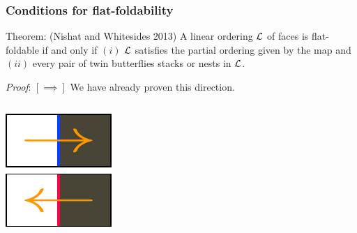 \documentclass{beamer}
\begin{document}
\begin{frame}
\frametitle{Conditions for flat-foldability}

\begin{block}{Theorem: (Nishat and Whitesides 2013)}
A linear ordering $\mathcal{L}$ of faces is flat-foldable if and only if $(i)$ $\mathcal{L}$ satisfies the partial ordering given by the map and $(ii)$ every pair of twin butterflies stacks or nests in $\mathcal{L}$. 
\end{block}

\medskip

\pause

\textit{Proof}: $[\implies]$ We have already proven this direction.

\medskip

\begin{columns}[c]

\pause

\includegraphics[width=\textwidth]{sam_images/checkerboard-tiles.pdf}

\pause


\end{columns}
\end{frame}
\end{document}

